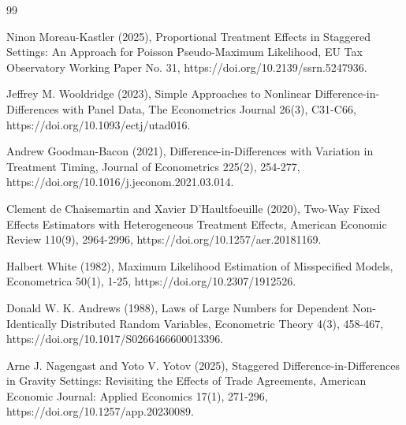 \documentclass{article}
\begin{document}
\begin{thebibliography}{99}

   Ninon Moreau-Kastler (2025), Proportional Treatment Effects in Staggered Settings: An Approach for Poisson Pseudo-Maximum Likelihood, EU Tax Observatory Working Paper No. 31, https://doi.org/10.2139/ssrn.5247936.

   Jeffrey M. Wooldridge (2023), Simple Approaches to Nonlinear Difference-in-Differences with Panel Data, The Econometrics Journal 26(3), C31-C66, https://doi.org/10.1093/ectj/utad016.

   Andrew Goodman-Bacon (2021), Difference-in-Differences with Variation in Treatment Timing, Journal of Econometrics 225(2), 254-277, https://doi.org/10.1016/j.jeconom.2021.03.014.

   Clement de Chaisemartin and Xavier D'Haultfoeuille (2020), Two-Way Fixed Effects Estimators with Heterogeneous Treatment Effects, American Economic Review 110(9), 2964-2996, https://doi.org/10.1257/aer.20181169.

   Halbert White (1982), Maximum Likelihood Estimation of Misspecified Models, Econometrica 50(1), 1-25, https://doi.org/10.2307/1912526.

   Donald W. K. Andrews (1988), Laws of Large Numbers for Dependent Non-Identically Distributed Random Variables, Econometric Theory 4(3), 458-467, https://doi.org/10.1017/S0266466600013396.

   Arne J. Nagengast and Yoto V. Yotov (2025), Staggered Difference-in-Differences in Gravity Settings: Revisiting the Effects of Trade Agreements, American Economic Journal: Applied Economics 17(1), 271-296, https://doi.org/10.1257/app.20230089.

\end{thebibliography}
\end{document}
